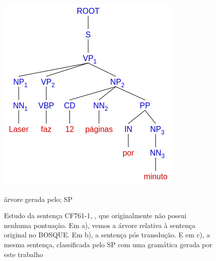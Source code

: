 \begin{figure}[!ht]
\begin{minipage}{.45\textwidth}
        \includegraphics[width=\linewidth]{imagens/ec_bosque_sem_ponto_tree_sp.png}
        \caption{árvore gerada pelo; SP}
    \end{minipage}
    \caption[Estudo de caso BOSQUE - Sentença transduzida sem pontuação]{Estudo da sentença CF761-1, , que originalmente não possui nenhuma pontuação. Em a), vemos a árvore relativa à sentença original no BOSQUE. Em b), a sentença pós transdução. E em c), a mesma sentença, classificada pelo SP com uma gramática gerada por este trabalho}
    \label{fig:ec_bosque_sem_ponto_tree}
\end{figure}
